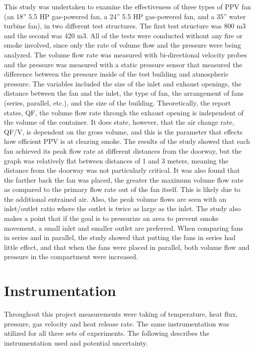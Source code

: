 \documentclass{article}
\begin{document}
This study was undertaken to examine the effectiveness of three types of PPV fan (an 18” 5.5 HP gas-powered fan, a 24” 5.5 HP gas-powered fan, and a 35” water turbine fan), in two different test structures. The first test structure was 800 m3 and the second was 420 m3. All of the tests were conducted without any fire or smoke involved, since only the rate of volume flow and the pressure were being analyzed. The volume flow rate was measured with bi-directional velocity probes and the pressure was measured with a static pressure sensor that measured the difference between the pressure inside of the test building and atmospheric pressure. The variables included the size of the inlet and exhaust openings, the distance between the fan and the inlet, the type of fan, the arrangement of fans (series, parallel, etc.), and the size of the building. Theoretically, the report states, QF, the volume flow rate through the exhaust opening is independent of the volume of the container. It does state, however, that the air change rate, QF/V, is dependent on the gross volume, and this is the parameter that effects how efficient PPV is at clearing smoke. The results of the study showed that each fan achieved its peak flow rate at different distances from the doorway, but the graph was relatively flat between distances of 1 and 3 meters, meaning the distance from the doorway was not particularly critical. It was also found that the farther back the fan was placed, the greater the maximum volume flow rate as compared to the primary flow rate out of the fan itself. This is likely due to the additional entrained air. Also, the peak volume flows are seen with an inlet/outlet ratio where the outlet is twice as large as the inlet. The study also makes a point that if the goal is to pressurize an area to prevent smoke movement, a small inlet and smaller outlet are preferred. When comparing fans in series and in parallel, the study showed that putting the fans in series had little effect, and that when the fans were placed in parallel, both volume flow and pressure in the compartment were increased.\cite{PPVmediumhouse}\\

\clearpage

\section{Instrumentation}
Throughout this project measurements were taking of temperature, heat flux, pressure, gas velocity and heat release rate. The same instrumentation was utilized for all three sets of experiments. The following describes the instrumentation used and potential uncertainty.
\end{document}

